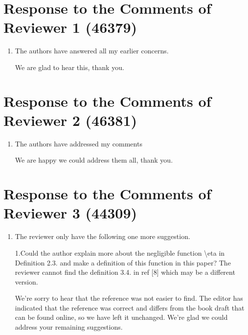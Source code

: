 \documentclass[a4paper]{scrartcl}
\newenvironment{rebuttal}{\begin{enumerate}[label={\color{grey}\thesection.\arabic{enumi}},leftmargin=0pt,ref=\thesection.\arabic{enumi}]}{\end{enumerate}}
\newcommand{\reviewtext}[1]{{\color{nblue} #1}}
\begin{document}
\section*{Response to the Comments of Reviewer 1 (46379)}
\def\thesection{R1}
\begin{rebuttal}
\item \reviewtext{The authors have answered all my earlier concerns.}

We are glad to hear this, thank you.

\end{rebuttal}


\section*{Response to the Comments of Reviewer 2 (46381)}
\def\thesection{R2}
\begin{rebuttal}
\item \reviewtext{The authors have addressed my comments}

We are happy we could address them all, thank you.

\end{rebuttal}


\section*{Response to the Comments of Reviewer 3 (44309)}
\def\thesection{R3}
\begin{rebuttal}
\item \reviewtext{The reviewer only have the following one more suggestion.

1.Could the author explain more about the negligible function \textbackslash eta in Definition 2.3. and make a definition of this function in this paper? The reviewer cannot find the definition 3.4. in ref [8] which may be a different version.}

We're sorry to hear that the reference was not easier to find. The editor has indicated that the reference was correct and differs from the book draft that can be found online, so we have left it unchanged. We're glad we could address your remaining suggestions.

\end{rebuttal}

%
\end{document}
